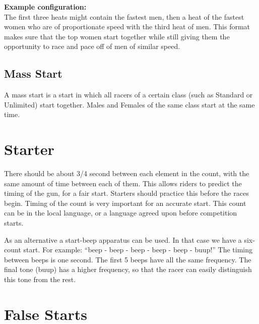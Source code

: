 \textbf{Example configuration:}\\
The first three heats might contain the fastest men, then a heat of the fastest women who are of proportionate speed with the third heat of men.
This format makes sure that the top women start together while still giving them the opportunity to race and pace off of men of similar speed.

\subsection{Mass Start \label{subsec:road_heat-assignment_mass-start}}

A mass start is a start in which all racers of a certain class (such as Standard or Unlimited) start together.
Males and Females of the same class start at the same time.

\section{Starter}

There should be about 3/4 second between each element in the count, with the same amount of time between each of them.
This allows riders to predict the timing of the gun, for a fair start.
Starters should practice this before the races begin.
Timing of the count is very important for an accurate start.
This count can be in the local language, or a language agreed upon before competition starts.

As an alternative a start-beep apparatus can be used.
In that case we have a six-count start.
For example: ``beep - beep - beep - beep - beep - buup!''
The timing between beeps is one second.
The first 5 beeps have all the same frequency.
The final tone (buup) has a higher frequency, so that the racer can easily distinguish this tone from the rest.

\section{False Starts \label{subsec:false_starts}}

